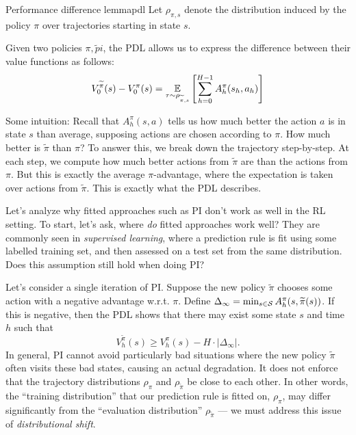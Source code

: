 \documentclass[\main/main]{subfiles}
\begin{document}
\begin{theorem}{Performance difference lemma}{pdl}
    Let $\rho_{\pi, s}$ denote the distribution induced by the policy $\pi$ over trajectories starting in state $s$.

    Given two policies $\pi, \tilde pi$, the PDL allows us to express the difference between their value functions as follows:
    \begin{equation}
        V_0^{\tilde \pi}(s) - V_0^\pi(s) = \E_{\tau \sim \rho_{\tilde \pi, s}} \left[ \sum_{h=0}^{H-1} A_h^\pi (s_h, a_h) \right]
    \end{equation}

    Some intuition: Recall that $A^\pi_h(s, a)$ tells us how much better the action $a$ is in state $s$ than average, supposing actions are chosen according to $\pi$.
    How much better is $\tilde \pi$ than $\pi$? To answer this, we break down the trajectory step-by-step. At each step, we compute how much better actions from $\tilde \pi$ are than the actions from $\pi$. But this is exactly the average $\pi$-advantage, where the expectation is taken over actions from $\tilde \pi$. This is exactly what the PDL describes.
\end{theorem}

Let's analyze why fitted approaches such as PI don't work as well in the RL setting.
To start, let's ask, where \emph{do} fitted approaches work well?
They are commonly seen in \emph{supervised learning}, where a prediction rule is fit using some labelled training set, and then assessed on a test set from the same distribution.
Does this assumption still hold when doing PI?

Let's consider a single iteration of PI.
Suppose the new policy $\tilde \pi$ chooses some action with a negative advantage w.r.t. $\pi$.
Define $\Delta_\infty = \min_{s \in \S} A^{\pi}_h(s, \tilde \pi(s))$.
If this is negative, then the PDL shows that there may exist some state $s$ and time $h$ such that
\[
    V_h^{\tilde \pi}(s) \ge V_h^{\pi}(s) - H \cdot |\Delta_\infty|.
\]
In general, PI cannot avoid particularly bad situations where the new policy $\tilde \pi$ often visits these bad states, causing an actual degradation.
It does not enforce that the trajectory distributions $\rho_\pi$ and $\rho_{\tilde \pi}$ be close to each other.
In other words, the ``training distribution'' that our prediction rule is fitted on, $\rho_\pi$, may differ significantly from the ``evaluation distribution'' $\rho_{\tilde \pi}$ --- we must address this issue of \emph{distributional shift}.
\end{document}
